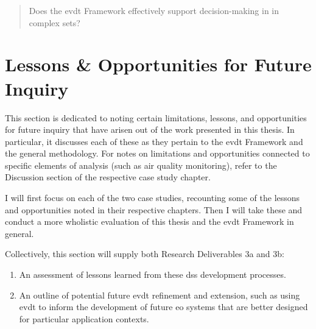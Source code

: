 \blockquote{Does the \ac{evdt} Framework effectively support decision-making in in complex \ac{sets}?}

\section{Lessons \& Opportunities for Future Inquiry} \label{sec:future-inquiry}

This section is dedicated to noting certain limitations, lessons, and opportunities for future inquiry that have arisen out of the work presented in this thesis. In particular, it discusses each of these as they pertain to the \ac{evdt} Framework and the general methodology. For notes on limitations and opportunities connected to specific elements of analysis (such as air quality monitoring), refer to the Discussion section of the respective case study chapter.

I will first focus on each of the two case studies, recounting some of the lessons and opportunities noted in their respective chapters. Then I will take these and conduct a more wholistic evaluation of this thesis and the \ac{evdt} Framework in general.

Collectively, this section will supply both Research Deliverables 3a and 3b:

\begin{enumerate}[label=\emph{\alph*},itemsep=0pt,parsep=0pt]
	\item{An assessment of lessons learned from these \ac{dss} development processes.} 
	\item{An outline of potential future \ac{evdt} refinement and extension, such as using \ac{evdt} to inform the development of future \ac{eo} systems that are better designed for particular application contexts.} 
\end{enumerate}





